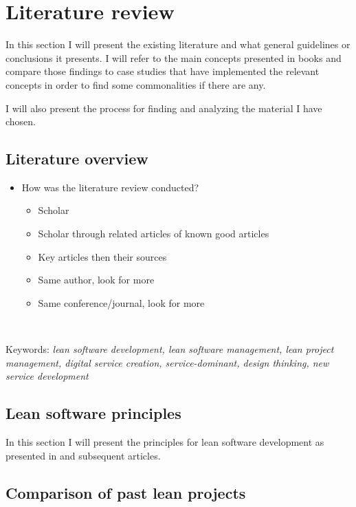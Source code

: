 
\chapter{Literature review}
\label{chapter:litterature}

In this section I will present the existing literature and what general guidelines or conclusions it presents. I will refer to the main concepts presented in books and compare those findings to case studies that have implemented the relevant concepts in order to find some commonalities if there are any.

I will also present the process for finding and analyzing the material I have chosen.

\section{Literature overview}
\label{section:litoverview}

\begin{itemize}
  \item{How was the literature review conducted?}
  \begin{itemize}
    \item{Scholar}
    \item{Scholar through related articles of known good articles}
    \item{Key articles then their sources}
    \item{Same author, look for more}
    \item{Same conference/journal, look for more}
  \end{itemize}
  \
\end{itemize}

Keywords: \textit{lean software development, lean software management, lean project management, digital service creation, service-dominant, design thinking, new service development}

\section{Lean software principles}
\label{section:leansoftwareprinciples}

In this section I will present the principles for lean software development as presented in \cite{poppendieck2003lean} and subsequent articles.

\section{Comparison of past lean projects}
\label{section:pastleanprojects}

